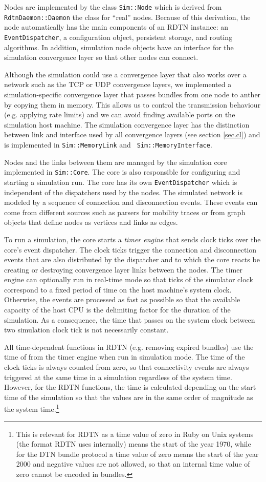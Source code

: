 \documentclass{article}
\begin{document}
Nodes are implemented by the class {\tt Sim::Node} which is derived from {\tt
RdtnDaemon::Daemon} the class for ``real'' nodes. Because of this derivation,
the node automatically has the main components of an RDTN instance: an {\tt
EventDispatcher}, a configuration object, persistent storage, and routing
algorithms. In addition, simulation node objects have an interface for the
simulation convergence layer so that other nodes can connect.

Although the simulation could use a convergence layer that also works over a
network such as the TCP or UDP convergence layers, we implemented a
simulation-specific convergence layer that passes bundles from one node to
anther by copying them in memory. This allows us to control the transmission
behaviour (e.g. applying rate limits) and we can avoid finding available ports
on the simulation host machine. The simulation convergence layer has
the distinction between link and interface used by all convergence layers (see
section \ref{sec.cl}) and is implemented in {\tt Sim::MemoryLink} and {\tt
Sim::MemoryInterface}.

Nodes and the links between them are managed by the simulation core implemented
in {\tt Sim::Core}. The core is also responsible for configuring and starting a
simulation run. The core has its own {\tt EventDispatcher} which is independent
of the dispatchers used by the nodes. The simulated network is modeled by a
sequence of connection and disconnection events. These events can come from
different sources such as parsers for mobility traces or from graph objects that
define nodes as vertices and links as edges.

To run a simulation, the core starts a {\em timer engine} that sends clock ticks
over the core's event dispatcher. The clock ticks trigger the connection and
disconnection events that are also distributed by the dispatcher and to which
the core reacts be creating or destroying convergence layer links between the
nodes. The timer engine can optionally run in real-time mode so that ticks of
the simulator clock correspond to a fixed period of time on the host machine's
system clock. Otherwise, the events are processed as fast as possible so that
the available capacity of the host CPU is the delimiting factor for the duration
of the simulation. As a consequence, the time that passes on the system clock
between two simulation clock tick is not necessarily constant.

All time-dependent functions in RDTN (e.g. removing expired bundles) use the
time of from the timer engine when run in simulation mode.  The time of the
clock ticks is always counted from zero, so that connectivity events are always
triggered at the same time in a simulation regardless of the system time.
However, for the RDTN functions, the time is calculated depending on the start
time of the simulation so that the values are in the same order of magnitude as
the system time.\footnote{This is relevant for RDTN as a time value of zero in
Ruby on Unix systems (the format RDTN uses internally) means the start of the
year 1970, while for the DTN bundle protocol a time value of zero means the
start of the year 2000 and negative values are not allowed, so that an internal
time value of zero cannot be encoded in bundles.}
\end{document}
